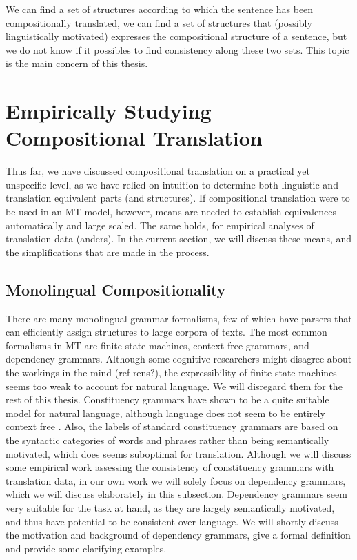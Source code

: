 \documentclass{report}
\theoremstyle{definition}
\theoremstyle{plain}
\begin{document}
We can find a set of structures according to which the sentence has been compositionally translated, we can find a set of structures that (possibly linguistically motivated) expresses the compositional structure of a sentence, but we do not know if it possibles to find consistency along these two sets. This topic is the main concern of this thesis.

\section{Empirically Studying Compositional Translation}

Thus far, we have discussed compositional translation on a practical yet unspecific level, as we have relied on intuition to determine both linguistic and translation equivalent parts (and structures). If compositional translation were to be used in an MT-model, however, means are needed to establish equivalences automatically and large scaled. The same holds, for empirical analyses of translation data (anders). In the current section, we will discuss these means, and the simplifications that are made in the process.

\subsection{Monolingual Compositionality}
\label{sec:depgram}

There are many monolingual grammar formalisms, few of which have parsers that can efficiently assign structures to large corpora of texts. The most common formalisms in MT are finite state machines, context free grammars, and dependency grammars. Although some cognitive researchers might disagree about the workings in the mind (ref rens?), the expressibility of finite state machines seems too weak to account for natural language. We will disregard them for the rest of this thesis. Constituency grammars have shown to be a quite suitable model for natural language, although language does not seem to be entirely context free \citep{shieber1987evidence}. Also, the labels of standard constituency grammars are based on the syntactic categories of words and phrases rather than being semantically motivated, which does seems suboptimal for translation. Although we will discuss some empirical work assessing the consistency of constituency grammars with translation data, in our own work we will solely focus on dependency grammars, which we will discuss elaborately in this subsection. Dependency grammars seem very suitable for the task at hand, as they are largely semantically motivated, and thus have potential to be consistent over language. We will shortly discuss the motivation and background of dependency grammars, give a formal definition and provide some clarifying examples.
\end{document}
